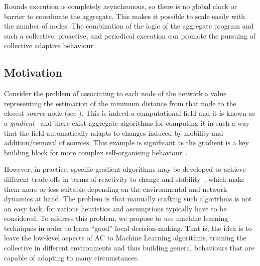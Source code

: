 \documentclass[conference]{IEEEtran}
\begin{document}
Rounds execution is completely asynchronous, so there is no global clock or barrier to coordinate the aggregate. 
%
 This makes it possible to scale easily with the number of nodes. 
%
The combination of the logic of the aggregate program
 and 
 such a collective, proactive, and periodical execution
 can promote the pursuing of collective adaptive behaviour.

\subsection{Motivation}

Consider the problem of associating
 to each node of the network
 a value
 representing the estimation of the minimum distance
 from that node to the closest \emph{source} node (see ).
%
This is indeed a computational field 
 and it is known as a \emph{gradient}~\cite{DBLP:conf/saso/AudritoCDV17}
 and there exist aggregate algorithms
 for computing it in such a way that
 the field automatically adapts 
 to changes induced by mobility
  and addition/removal of sources.
%
This example is significant as the gradient is a key building block 
 for more complex self-organising behaviour~\cite{DBLP:journals/jlap/ViroliBDACP19}.

However, in practice, 
 specific gradient algorithms
 may be developed
 to achieve different trade-offs 
 in terms of reactivity to change and stability~\cite{DBLP:conf/saso/AudritoCDV17},
 which make them more or less suitable depending on 
 the environmental and network dynamics at hand.
%
The problem is that manually crafting such algorithms
 is not an easy task, for various heuristics and assumptions typically have to be considered.
%
To address this problem,
 we propose to use machine learning techniques
 in order to learn ``good'' local decision-making.
% 
That is, the idea is to leave the low-level aspects of AC to Machine Learning algorithms, 
 training the collective in different environments and thus building general behaviours that are capable of adapting to many circumstances.
\end{document}
